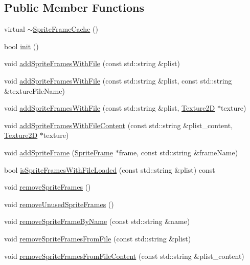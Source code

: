 \subsection*{Public Member Functions}
\begin{DoxyCompactItemize}
\item 
virtual \hyperlink{classSpriteFrameCache_aa8c9088cb2b31d8ec6ff3e958f392ff7}{$\sim$\+Sprite\+Frame\+Cache} ()
\item 
bool \hyperlink{classSpriteFrameCache_a45438c56c17c4def48da6ee790c23c0e}{init} ()
\item 
void \hyperlink{classSpriteFrameCache_ad99267fc3a1f057d2efcbb43f75a9d2e}{add\+Sprite\+Frames\+With\+File} (const std\+::string \&plist)
\item 
void \hyperlink{classSpriteFrameCache_aec8dc209f1f9f297b319af67f0d8aa0c}{add\+Sprite\+Frames\+With\+File} (const std\+::string \&plist, const std\+::string \&texture\+File\+Name)
\item 
void \hyperlink{classSpriteFrameCache_a0cadaca840049f5009c7b2a288a9bd70}{add\+Sprite\+Frames\+With\+File} (const std\+::string \&plist, \hyperlink{classTexture2D}{Texture2D} $\ast$texture)
\item 
void \hyperlink{classSpriteFrameCache_a6288e49af5e6b3b052de916565923c32}{add\+Sprite\+Frames\+With\+File\+Content} (const std\+::string \&plist\+\_\+content, \hyperlink{classTexture2D}{Texture2D} $\ast$texture)
\item 
void \hyperlink{classSpriteFrameCache_ae4f777955e41dd502fff0f85370c730c}{add\+Sprite\+Frame} (\hyperlink{classSpriteFrame}{Sprite\+Frame} $\ast$frame, const std\+::string \&frame\+Name)
\item 
bool \hyperlink{classSpriteFrameCache_a9f5b03798546f9a18112feebe8e074eb}{is\+Sprite\+Frames\+With\+File\+Loaded} (const std\+::string \&plist) const
\item 
void \hyperlink{classSpriteFrameCache_ad39158545a4c85b1ef33187450e1e7f0}{remove\+Sprite\+Frames} ()
\item 
void \hyperlink{classSpriteFrameCache_a056756d97a724f7d8ef9efd1c9a11074}{remove\+Unused\+Sprite\+Frames} ()
\item 
void \hyperlink{classSpriteFrameCache_a970b7aba25986a18fe2353bf1e587f44}{remove\+Sprite\+Frame\+By\+Name} (const std\+::string \&name)
\item 
void \hyperlink{classSpriteFrameCache_a1edf0ddf258ccb7ea843379f5b99aac5}{remove\+Sprite\+Frames\+From\+File} (const std\+::string \&plist)
\item 
void \hyperlink{classSpriteFrameCache_afbc12b894257ad87d0e638b9ce7decab}{remove\+Sprite\+Frames\+From\+File\+Content} (const std\+::string \&plist\+\_\+content)

\end{DoxyCompactItemize}
